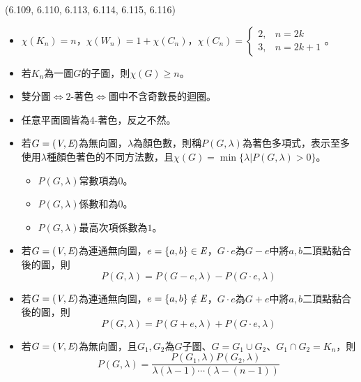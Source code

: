 \item \begin{theorem}{(6.109, 6.110, 6.113, 6.114, 6.115, 6.116)} \quad\quad
    \begin{itemize}
        \item $\chi(K_n) = n$，$\chi(W_n) = 1 + \chi(C_n)$，$\chi(C_n) = \begin{cases}
            2, & n = 2k \\ 3, & n = 2k + 1
        \end{cases}$。
        \item 若$K_n$為一圖$G$的子圖，則$\chi(G) \ge n$。
        \item 雙分圖$\iff$$2$-著色$\iff$圖中不含奇數長的迴圈。
        \item 任意平面圖皆為$4$-著色，反之不然。
        \item 若$G = (\textit{V}, \textit{E})$為無向圖，$\lambda$為顏色數，則稱$P(G, \lambda)$為著色多項式，表示至多使用$\lambda$種顏色著色的不同方法數，且$\chi(G) = \min\{\lambda | P(G, \lambda) > 0\}$。\begin{itemize}
            \item $P(G, \lambda)$常數項為$0$。
            \item $P(G, \lambda)$係數和為$0$。
            \item $P(G, \lambda)$最高次項係數為$1$。
        \end{itemize}
        \item 若$G = (\textit{V}, \textit{E})$為連通無向圖，$e = \{a, b\} \in \textit{E}$，$G \cdot e$為$G - e$中將$a, b$二頂點黏合後的圖，則\begin{equation}
            P(G, \lambda) = P(G - e, \lambda) - P(G \cdot e, \lambda)
        \end{equation}
        \item 若$G = (\textit{V}, \textit{E})$為連通無向圖，$e = \{a, b\} \notin \textit{E}$，$G \cdot e$為$G + e$中將$a, b$二頂點黏合後的圖，則\begin{equation}
            P(G, \lambda) = P(G + e, \lambda) + P(G \cdot e, \lambda)
        \end{equation}
        \item 若$G = (\textit{V}, \textit{E})$為無向圖，且$G_1, G_2$為$G$子圖、$G = G_1 \cup G_2$、$G_1 \cap G_2 = K_n$，則\begin{equation}
            P(G, \lambda) = \frac{P(G_1, \lambda)P(G_2, \lambda)}{\lambda(\lambda - 1)\cdots(\lambda - (n - 1))}
        \end{equation}
    \end{itemize}
\end{theorem}
